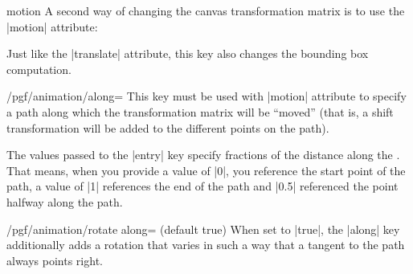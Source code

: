 \begin{animateattribute}{motion}
    A second way of changing the canvas transformation matrix is to use the
    |motion| attribute:
\begin{codeexample}[animation list={0.5,1,1.5,2}]
\end{codeexample}

    Just like the |translate| attribute, this key also changes the bounding box
    computation.
    \begin{key}{/pgf/animation/along=}
        This key must be used with |motion| attribute to specify a path along
        which the transformation matrix will be ``moved'' (that is, a shift
        transformation will be added to the different points on the path).

        The values passed to the |entry| key specify fractions of the distance
        along the . That means, when you provide a value of |0|, you
        reference the start point of the path, a value of |1| references the
        end of the path and |0.5| referenced the point halfway along the path.
\begin{codeexample}[animation list={0.25,0.5,0.75,1,1.25,1.5,1.75,2,2.25,2.5}]
\end{codeexample}
    \end{key}

    \begin{key}{/pgf/animation/rotate along= (default true)}
        When set to |true|, the |along| key additionally adds a rotation that
        varies in such a way that a tangent to the path always points right.
\begin{codeexample}[animation list={0.5,1,1.5,2}]
\end{codeexample}
    \end{key}
\end{animateattribute}

